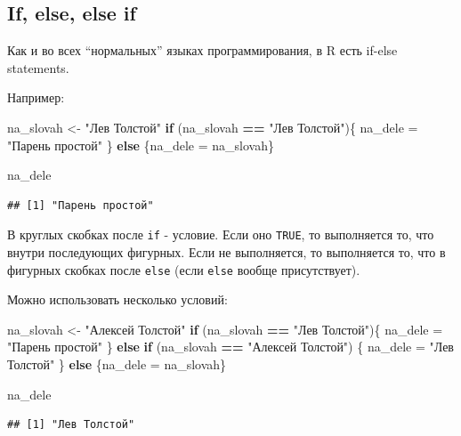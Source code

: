 \documentclass[]{book}
\newenvironment{Shaded}{\begin{snugshade}}{\end{snugshade}}
\newcommand{\StringTok}[1]{\textcolor[rgb]{0.31,0.60,0.02}{#1}}
\newcommand{\ControlFlowTok}[1]{\textcolor[rgb]{0.13,0.29,0.53}{\textbf{#1}}}
\newcommand{\OperatorTok}[1]{\textcolor[rgb]{0.81,0.36,0.00}{\textbf{#1}}}
\newcommand{\NormalTok}[1]{#1}
\begin{document}
\subsection{If, else, else if}\label{ifelse}

Как и во всех ``нормальных'' языках программирования, в R есть if-else
statements.

Например:

\begin{Shaded}
\begin{Highlighting}[]
\NormalTok{na_slovah <-}\StringTok{ "Лев Толстой"}
\ControlFlowTok{if}\NormalTok{ (na_slovah }\OperatorTok{==}\StringTok{ "Лев Толстой"}\NormalTok{)\{}
\NormalTok{  na_dele =}\StringTok{ "Парень простой"}
\NormalTok{\} }\ControlFlowTok{else}\NormalTok{ \{na_dele =}\StringTok{ }\NormalTok{na_slovah\} }

\NormalTok{na_dele}
\end{Highlighting}
\end{Shaded}

\begin{verbatim}
## [1] "Парень простой"
\end{verbatim}

В круглых скобках после \texttt{if} - условие. Если оно \texttt{TRUE},
то выполняется то, что внутри последующих фигурных. Если не выполняется,
то выполняется то, что в фигурных скобках после \texttt{else} (если
\texttt{else} вообще присутствует).

Можно использовать несколько условий:

\begin{Shaded}
\begin{Highlighting}[]
\NormalTok{na_slovah <-}\StringTok{ "Алексей Толстой"}
\ControlFlowTok{if}\NormalTok{ (na_slovah }\OperatorTok{==}\StringTok{ "Лев Толстой"}\NormalTok{)\{}
\NormalTok{  na_dele =}\StringTok{ "Парень простой"}
\NormalTok{\} }\ControlFlowTok{else} \ControlFlowTok{if}\NormalTok{ (na_slovah }\OperatorTok{==}\StringTok{ "Алексей Толстой"}\NormalTok{) \{}
\NormalTok{  na_dele =}\StringTok{ "Лев Толстой"}
\NormalTok{\} }\ControlFlowTok{else}\NormalTok{ \{na_dele =}\StringTok{ }\NormalTok{na_slovah\}}

\NormalTok{na_dele}
\end{Highlighting}
\end{Shaded}

\begin{verbatim}
## [1] "Лев Толстой"
\end{verbatim}
\end{document}
